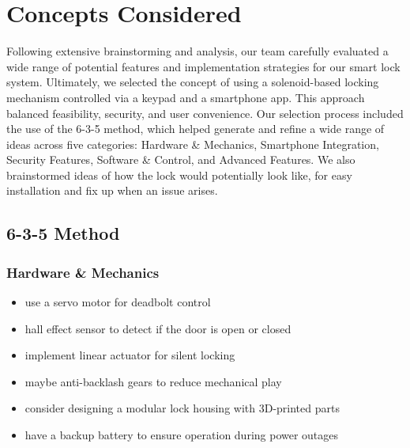 \newpage
\section{Concepts Considered}


Following extensive brainstorming and analysis, our team carefully evaluated a wide range of potential features and implementation strategies for our smart lock system. Ultimately, we selected the concept of using a solenoid-based locking mechanism controlled via a keypad and a smartphone app. This approach balanced feasibility, security, and user convenience. Our selection process included the use of the 6-3-5 method, which helped generate and refine a wide range of ideas across five categories: Hardware \& Mechanics, Smartphone Integration, Security Features, Software \& Control, and Advanced Features. We also brainstormed ideas of how the lock would potentially look like, for easy installation and fix up when an issue arises. 


\subsection{6-3-5 Method}
\subsubsection*{Hardware \& Mechanics}
\begin{itemize}
    \item use a servo motor for deadbolt control
    \item hall effect sensor to detect if the door is open or closed
    \item implement linear actuator for silent locking
    \item maybe anti-backlash gears to reduce mechanical play
    \item consider designing a modular lock housing with 3D-printed parts
    \item have a backup battery to ensure operation during power outages
\end{itemize}

